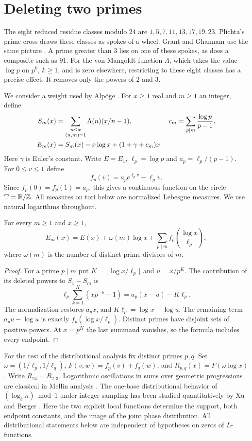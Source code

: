 \section{Deleting two primes}\label{sec:local}
The eight reduced residue classes modulo $24$ are
$1,5,7,11,13,17,19,23$. Plichta's prime cross draws these classes
as spokes of a wheel. Grant and Ghannam use the same picture
\cite{plichta,grant}. A prime greater than $3$ lies on one of these
spokes, as does a composite such as $91$. For the von Mangoldt function
$\Lambda$, which takes the value $\log p$ on $p^k$, $k\geq1$, and is
zero elsewhere, restricting to these eight classes has a precise effect.
It removes only the powers of $2$ and $3$.

We consider a weight used by Alpöge \cite[p.~3, item 5]{alpoge}.
For $x\geq1$ real and $m\geq1$ an integer, define
\begin{align}
 S_m(x)&=\sum_{\substack{n\leq x\\(n,m)=1}}\Lambda(n)(x/n-1),
 &c_m&=\sum_{p\mid m}\frac{\log p}{p-1},\notag\\
 E_m(x)&=S_m(x)-x\log x+(1+\gamma+c_m)x. \label{eq:normalization}
\end{align}
Here $\gamma$ is Euler's constant. Write $E=E_1$, $\ell_p=\log p$
and $a_p=\ell_p/(p-1)$. For $0\leq v\leq1$ define
\[
 f_p(v)=a_p e^{\ell_p v}-\ell_p v.
\]
Since $f_p(0)=f_p(1)=a_p$, this gives a continuous function on the
circle $\mathbb T=\mathbb R/\mathbb Z$. All measures on tori below are normalized
Lebesgue measures. We use natural logarithms throughout.

\begin{prop}\label{prop:local}
For every $m\geq1$ and $x\geq1$,
\begin{equation}
 E_m(x)=E(x)+\omega(m)\log x+
 \sum_{p\mid m}f_p\!\left(\frac{\log x}{\ell_p}\right),
 \label{eq:correction}
\end{equation}
where $\omega(m)$ is the number of distinct prime divisors of $m$.
\end{prop}
\begin{proof}
For a prime $p\mid m$ put $K=\lfloor\log x/\ell_p\rfloor$ and
$u=x/p^K$. The contribution of its deleted powers to $S_1-S_m$ is
\[
 \ell_p\sum_{k=1}^K(xp^{-k}-1)
 =a_p(x-u)-K\ell_p.
\]
The normalization restores $a_px$, and
$K\ell_p=\log x-\log u$.
The remaining term $a_pu-\log u$ is exactly
$f_p(\log x/\ell_p)$. Distinct primes have disjoint sets of positive
powers. At $x=p^K$ the last summand vanishes, so the formula includes
every endpoint.
\end{proof}

For the rest of the distributional analysis fix distinct primes $p,q$.
Set $\omega=(1/\ell_p,1/\ell_q)$,
$F(v,w)=f_p(v)+f_q(w)$, and $R_{p,q}(x)=F(\omega\log x)$.
Write $R_{24}=R_{2,3}$. Logarithmic oscillations in sums over geometric
progressions are classical in Mellin analysis \cite{fgd}.
The one-base distributional behavior of $(\log_b n)\bmod 1$ under
integer sampling has been studied quantitatively by Xu and Berger
\cite{xu,berger}.
Here the two explicit local functions determine the support, both
endpoint constants, and the image of the joint phase distribution.
All distributional statements below are independent of hypotheses on
zeros of $L$-functions.
